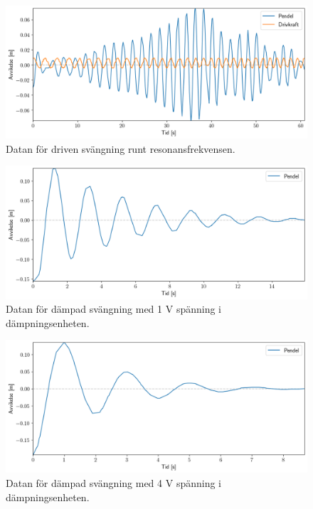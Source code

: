 \documentclass[12pt, a4paper]{article}
\begin{document}
\begin{figure}[hp]
	\includegraphics[width=\textwidth]{graf_resonansfrekvens}
	\caption{Datan för driven svängning runt resonansfrekvensen.}
	\label{fig:data_resonansfrekvens}
\end{figure}

\begin{figure}[hp]
	\includegraphics[width=\textwidth]{graf_1_v_centered}
	\caption{Datan för dämpad svängning med 1 V spänning i dämpningsenheten.}
	\label{fig:data_1_v}
\end{figure}

\begin{figure}[hp]
	\includegraphics[width=\textwidth]{graf_4_v_centered}
	\caption{Datan för dämpad svängning med 4 V spänning i dämpningsenheten.}
	\label{fig:data_4_v}
\end{figure}
\end{document}
